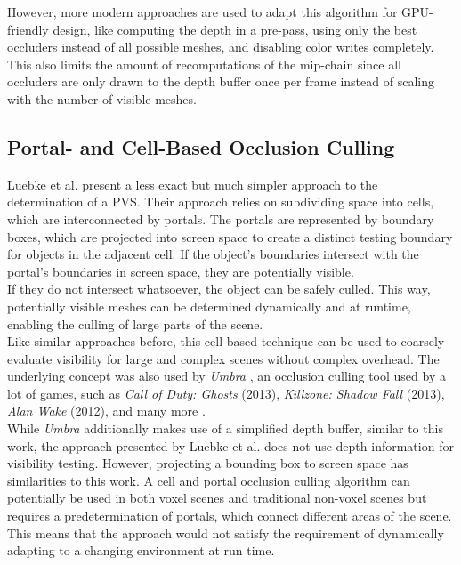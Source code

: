 \noindent
However, more modern approaches are used to adapt this algorithm for \ac{GPU}-friendly design, like computing the depth 
in a pre-pass, using only the best occluders instead of all possible meshes, and disabling color writes completely. This 
also limits the amount of recomputations of the mip-chain since all occluders are only drawn to the depth buffer once per 
frame instead of scaling with the number of visible meshes.


\subsection*{Portal- and Cell-Based Occlusion Culling}

Luebke et al. \cite{Luebke1995} present a less exact but much simpler approach to the determination
of a \ac{PVS}. Their approach relies on subdividing space into cells, which are interconnected by 
portals. The portals are represented by boundary boxes, which are projected into screen space to 
create a distinct testing boundary for objects in the adjacent cell. If the object's boundaries 
intersect with the portal's boundaries in screen space, they are potentially visible.  \\

\noindent
If they do not intersect whatsoever, the object can be safely culled. This way, potentially visible 
meshes can be determined dynamically and at runtime, enabling the culling of large parts of the scene. \\

\noindent
Like similar approaches before, this cell-based technique can be used to coarsely evaluate visibility 
for large and complex scenes without complex overhead. The underlying concept was also used by 
\emph{Umbra} \cite{Umbra2024}, an occlusion culling tool used by a lot of games, such as 
\emph{Call of Duty: Ghosts} (2013), \emph{Killzone: Shadow Fall} (2013), \emph{Alan Wake} (2012), 
and many more \cite{UmbraWiki,CallOfDutyGhostsCredits,KillzoneUmbra,AlanWakeUmbra}. \\

\noindent
While \emph{Umbra} additionally makes use of a simplified depth buffer, similar to this work, the approach 
presented by Luebke et al. does not use depth information for visibility testing. However, projecting a 
bounding box to screen space has similarities to this work. A cell and portal occlusion culling algorithm 
can potentially be used in both voxel scenes and traditional non-voxel scenes but requires a 
predetermination of portals, which connect different areas of the scene. This means that the approach would 
not satisfy the requirement of dynamically adapting to a changing environment at run time. \\


